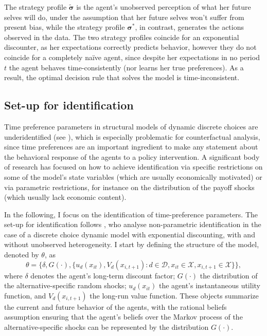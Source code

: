 The strategy profile $\boldsymbol{\tilde{\sigma}}$ is the agent's unobserved perception of what her future selves will do, under the assumption that her future selves won't suffer from present bias, while the strategy profile $\boldsymbol{\sigma^*}$, in contrast, generates the actions observed in the data. The two strategy profiles coincide for an exponential discounter, as her expectations correctly predicts behavior, however they do not coincide for a completely naïve agent, since despite her expectations in no period $t$ the agent behaves time-consistently (nor learns her true preferences). As a result, the optimal decision rule that solves the model is time-inconsistent.

\subsection{Set-up for identification}

Time preference parameters in structural models of dynamic discrete choices are underidentified (see \cite{Rust1994}), which is especially problematic for counterfactual analysis, since time preferences are an important ingredient to make any statement about the behavioral response of the agents to a policy intervention. A significant body of research has focused on how to achieve identification via specific restrictions on some of the model's state variables (which are usually economically motivated) or via parametric restrictions, for instance on the distribution of the payoff shocks (which usually lack economic content).

In the following, I focus on the identification of time-preference parameters. The set-up for identification follows \textcite{MagnacThesmar2002}, who analyse non-parametric identification in the case of a discrete choice dynamic model with exponential discounting, with and without unobserved heterogeneity. I start by defining the structure of the model, denoted by $\theta$, as
\begin{equation} \label{def:model-structure}
\theta = \{\delta, G(\cdot), \{u_d(x_{it}), V_d(x_{i,t+1}): d \in \mathcal{D}, x_{it} \in \mathcal{X}, x_{i,t+1} \in \mathcal{X}\}\},
\end{equation}
where $\delta$ denotes the agent's long-term discount factor; $G(\cdot)$ the distribution of the alternative-specific random shocks; $u_d(x_{it})$ the agent's instantaneous utility function, and $V_d(x_{i,t+1})$ the long-run value function. These objects summarize the current and future behavior of the agents, with the rational beliefs assumption ensuring that the agent's beliefs over the Markov process of the alternative-specific shocks can be represented by the distribution $G(\cdot)$.


